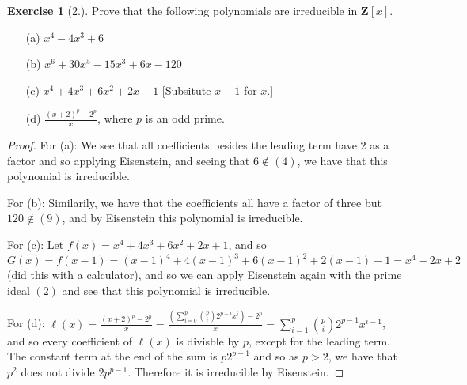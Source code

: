 \documentclass[9pt,reqno]{amsart}
\theoremstyle{definition}
\newtheorem{exercise}{Exercise}[section]
\newcommand{\zz}{\mathbf Z}
\begin{document}
\begin{exercise}[2.] Prove that the following polynomials are irreducible in $\zz[x]$.
\begin{itemize}
	\item[(a)] $x^4 - 4x^3 + 6$
	\item[(b)] $x^6 + 30x^5 -15x^3 + 6x -120$
	\item[(c)] $x^4 + 4x^3 + 6x^2 + 2x+ 1$ [Subsitute $x-1$ for $x$.]
	\item[(d)] $\frac{(x+2)^p -2^p}{x}$, where $p$ is an odd prime. 
\end{itemize}
	\begin{proof}
		For (a): We see that all coefficients besides the leading term have $2$ as a factor and so applying Eisenstein, and seeing that $6 \notin (4)$, we have that this polynomial is irreducible.
		
		
		For (b): Similarily, we have that the coefficients all have a factor of three but $120 \notin (9)$, and by Eisenstein this polynomial is irreducible. 
		
		For (c): Let $f(x) = x^4 + 4x^3 + 6x^2 +2x +1$, and so $G(x) = f(x-1) = (x-1)^4 + 4(x-1)^3 + 6(x-1)^2 +2(x-1) + 1 = x^4-2x+2$ (did this with a calculator), and so we can apply Eisenstein again with the prime ideal $(2)$ and see that this polynomial is irreducible.
		
		For (d): $\ell (x) = \frac{(x+2)^p-2^p}{x} = \frac{ (\sum_{i=0}^p \binom{p}{i} 2^{p-i} x^i) - 2^p}{x} = \sum_{i=1}^p \binom{p}{i} 2^{p-1} x^{i-1}$, and so every coefficient of $\ell (x)$ is divisble by $p$, except for the leading term. The constant term at the end of the sum is $p2^{p-1}$ and so as $p>2$, we have that $p^2$ does not divide $2p^{p-1}$. Therefore it is irreducible by Eisenstein. 
		\end{proof}
\end{exercise}
\end{document}
